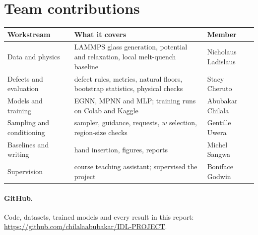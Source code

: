 \documentclass[10pt]{article}
\newcommand{\repo}{\url{https://github.com/chilalaabubakar/IDL-PROJECT}}
\begin{document}
\section*{Team contributions}
\small
\begin{tabularx}{\linewidth}{@{}l>{\raggedright\arraybackslash}Xl@{}}
\toprule
Workstream & What it covers & Member \\
\midrule
Data and physics & LAMMPS glass generation, potential and relaxation, local melt-quench baseline & Nicholaus Ladislaus \\
Defects and evaluation & defect rules, metrics, natural floors, bootstrap statistics, physical checks & Stacy Cheruto \\
Models and training & EGNN, MPNN and MLP; training runs on Colab and Kaggle & Abubakar Chilala \\
Sampling and conditioning & sampler, guidance, requests, $w$ selection, region-size checks & Gentille Uwera \\
Baselines and writing & hand insertion, figures, reports & Michel Sangwa \\
Supervision & course teaching assistant; supervised the project & Boniface Godwin \\
\bottomrule
\end{tabularx}
\normalsize

\paragraph{GitHub.} Code, datasets, trained models and every result in this report: \repo.


{\small}
\end{document}
